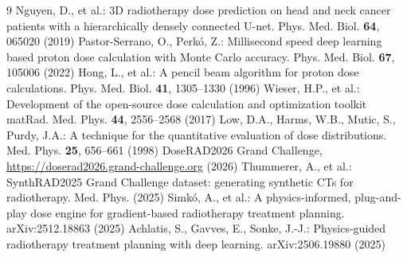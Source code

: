 \documentclass{llncs}
\begin{document}
\clearpage
\begin{thebibliography}{9}\small
{} Nguyen, D., et al.: 3D radiotherapy dose prediction on head and neck cancer
patients with a hierarchically densely connected U-net. Phys. Med. Biol. \textbf{64}, 065020 (2019)
 Pastor-Serrano, O., Perk\'o, Z.: Millisecond speed deep learning based proton dose
calculation with Monte Carlo accuracy. Phys. Med. Biol. \textbf{67}, 105006 (2022)
 Hong, L., et al.: A pencil beam algorithm for proton dose calculations. Phys. Med.
Biol. \textbf{41}, 1305--1330 (1996)
 Wieser, H.P., et al.: Development of the open-source dose calculation and
optimization toolkit matRad. Med. Phys. \textbf{44}, 2556--2568 (2017)
 Low, D.A., Harms, W.B., Mutic, S., Purdy, J.A.: A technique for the quantitative
evaluation of dose distributions. Med. Phys. \textbf{25}, 656--661 (1998)
 DoseRAD2026 Grand Challenge, \url{https://doserad2026.grand-challenge.org} (2026)
 Thummerer, A., et al.: SynthRAD2025 Grand Challenge dataset: generating
synthetic CTs for radiotherapy. Med. Phys. (2025)
 Simk\'o, A., et al.: A physics-informed, plug-and-play dose engine for
gradient-based radiotherapy treatment planning. arXiv:2512.18863 (2025)
 Achlatis, S., Gavves, E., Sonke, J.-J.: Physics-guided radiotherapy treatment
planning with deep learning. arXiv:2506.19880 (2025)
\end{thebibliography}
\end{document}
